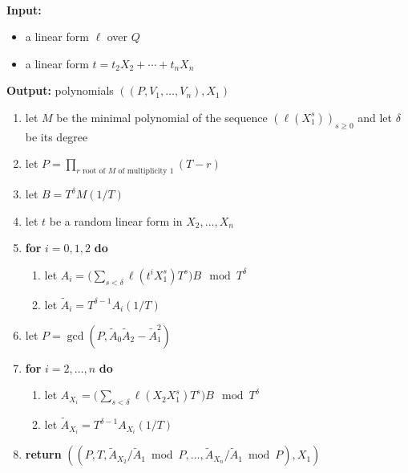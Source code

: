 \documentclass[12pt]{article}
\begin{document}
\begin{algorithm}[H]
	\caption{$\mathsf{ParametrizationX}_1(\ell,t)$}
	~\\
	{\bf Input:} \vspace{-0.5em}
	\begin{itemize}\setlength\itemsep{0em}
		\item a linear form $\ell$ over $Q$
		\item a linear form $t=t_2 X_2 + \cdots + t_n X_n$
	\end{itemize}
	{\bf Output:} polynomials $((P,V_1,\dots,V_n),X_1)$
	\begin{enumerate}\setlength\itemsep{0em}
		\item let $M$ be the minimal polynomial of the sequence $(\ell(X_1^s))_{s \ge 0}$ and let $\delta$ be its degree
		\item let $P = \prod_{r \text{~root of $M$ of multiplicity 1}}(T-r)$
		\item let $B=T^\delta M(1/T)$
		\item let $t$ be a random linear form in $X_2,\dots,X_n$
		\item \textbf{for} $i=0,1,2$ \textbf{do}
		\begin{enumerate}
			\item let $A_i = \big (\sum_{s < \delta} \ell(t^i X_1^s)T^s\big )B \mod T^{\delta}$
			\item let $\tilde A_i = T^{\delta -1}A_i(1/T)$
		\end{enumerate}
		\item\label{step:updateP} let $P = \gcd(P, \tilde A_0 \tilde A_2-\tilde A_1^2)$
		\item \textbf{for} $i=2,\dots,n$ \textbf{do}
		\begin{enumerate}
			\item let $A_{X_i} = \big (\sum_{s < \delta} \ell(X_2 X_1^s)T^s\big)B \mod T^{\delta}$ 
			\item let $\tilde A_{X_i} = T^{\delta -1}A_{X_i}(1/T)$
		\end{enumerate}
		\item \textbf{return} $((P,T,\tilde A_{X_2}/\tilde A_1 \bmod P, \dots,\tilde A_{X_n}/\tilde A_{1} \bmod P),X_1)$
	\end{enumerate}
	\label{algo:para}
\end{algorithm}
\end{document}
